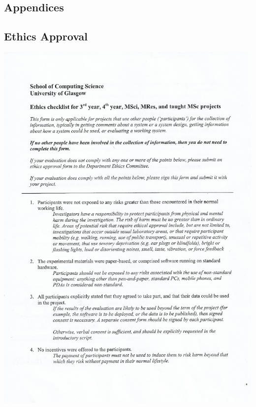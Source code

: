 \documentclass{l4proj}
\begin{document}
%
% 

\begin{appendices}

\chapter{Appendices}

\section{Ethics Approval}
\includegraphics[page=1, scale=0.55]{images/SignedEthicsApproval.pdf}


\end{appendices}
\end{document}
